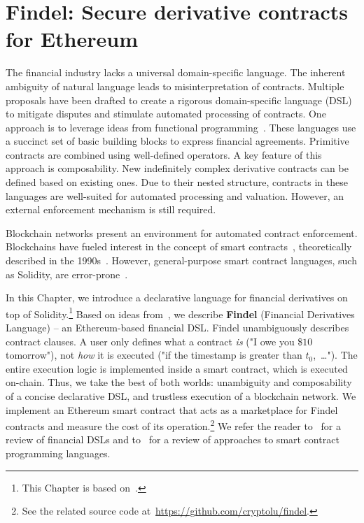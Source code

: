 \chapter{Findel: Secure derivative contracts for Ethereum}

\label{Chapter10Findel}

The financial industry lacks a universal domain-specific language.
The inherent ambiguity of natural language leads to misinterpretation of contracts.
Multiple proposals have been drafted to create a rigorous domain-specific language (DSL) to mitigate disputes and stimulate automated processing of contracts.
One approach is to leverage ideas from functional programming~\cite{PeytonJones2000, Szabo2002, Frankau2009, Gaillourdet2011, Schuldenzucker2014, Schuldenzucker2016}.
These languages use a succinct set of basic building blocks to express financial agreements.
Primitive contracts are combined using well-defined operators.
A key feature of this approach is composability.
New indefinitely complex derivative contracts can be defined based on existing ones.
Due to their nested structure, contracts in these languages are well-suited for automated processing and valuation.
However, an external enforcement mechanism is still required.

Blockchain networks present an environment for automated contract enforcement.
Blockchains have fueled interest in the concept of smart contracts~\cite{Castillo2016}, theoretically described in the 1990s~\cite{Szabo1997}.
However, general-purpose smart contract languages, such as Solidity, are error-prone~\cite{Sirer2016, Atzei2017}.

In this Chapter, we introduce a declarative language for financial derivatives on top of Solidity.\footnote{This Chapter is based on~\cite{Biryukov2017}.}
Based on ideas from~\cite{PeytonJones2000}, we describe \textbf{Findel} (Financial Derivatives Language) -- an Ethereum-based financial DSL\@.
Findel unambiguously describes contract clauses.
A user only defines what a contract \textit{is} ("I owe you \$$10$ tomorrow"), not \textit{how} it is executed ("if the timestamp is greater than $t_0$,~\dots").
The entire execution logic is implemented inside a smart contract, which is executed on-chain.
Thus, we take the best of both worlds: unambiguity and composability of a concise declarative DSL, and trustless execution of a blockchain network.
We implement an Ethereum smart contract that acts as a marketplace for Findel contracts and measure the cost of its operation.\footnote{See the related source code at~\url{https://github.com/cryptolu/findel}.}
We refer the reader to~\cite{Hvitved2010, Schiller2013} for a review of financial DSLs and to~\cite{Seijas2016, Clack2016} for a review of approaches to smart contract programming languages.



